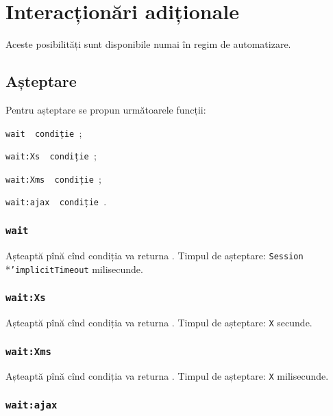 \section{Interacționări adiționale}

Aceste posibilități sunt disponibile numai în regim de automatizare.

\subsection{Așteptare}

Pentru așteptare se propun următoarele funcții:
\begin{icItems}
	\item \texttt{wait { condiție }};
	\item \texttt{wait:Xs { condiție }};
	\item \texttt{wait:Xms { condiție }};
	\item \texttt{wait:ajax { condiție }}.
\end{icItems}

\subsubsection{\texttt{wait}}

Așteaptă pînă cînd condiția va returna \true. Timpul de așteptare: \texttt{Session}\\*\texttt{'implicitTimeout} milisecunde. 

\subsubsection{\texttt{wait:Xs}}

Așteaptă pînă cînd condiția va returna \true. Timpul de așteptare: \texttt{X} secunde. 

\subsubsection{\texttt{wait:Xms}}

Așteaptă pînă cînd condiția va returna \true. Timpul de așteptare: \texttt{X} milisecunde. 

\subsubsection{\texttt{wait:ajax}}

